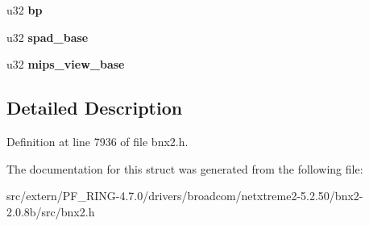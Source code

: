 \begin{DoxyCompactItemize}
\item 
\hypertarget{structcpu__reg_ada10e92568cc5658ef2ea43e583bf669}{
u32 {\bfseries bp}}
\label{structcpu__reg_ada10e92568cc5658ef2ea43e583bf669}

\item 
\hypertarget{structcpu__reg_afc476c9dbef4d5d3989d2f0fce25653d}{
u32 {\bfseries spad\_\-base}}
\label{structcpu__reg_afc476c9dbef4d5d3989d2f0fce25653d}

\item 
\hypertarget{structcpu__reg_a056bef9de94b19fa6ee3575bc2082d6a}{
u32 {\bfseries mips\_\-view\_\-base}}
\label{structcpu__reg_a056bef9de94b19fa6ee3575bc2082d6a}

\end{DoxyCompactItemize}


\subsection{Detailed Description}


Definition at line 7936 of file bnx2.h.



The documentation for this struct was generated from the following file:\begin{DoxyCompactItemize}
\item 
src/extern/PF\_\-RING-\/4.7.0/drivers/broadcom/netxtreme2-\/5.2.50/bnx2-\/2.0.8b/src/bnx2.h\end{DoxyCompactItemize}
